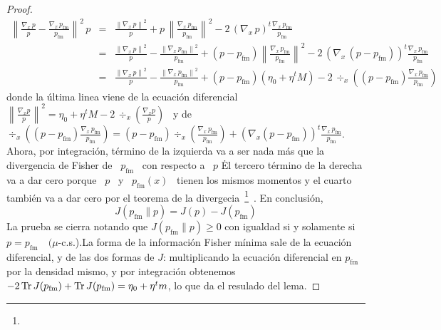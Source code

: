 \begin{proof}
  \begin{eqnarray*}
  \left\| \frac{\nabla_x \, p}{p} - \frac{\nabla_x
  \, p_{\mathrm{fm}}}{p_{\mathrm{fm}}} \right\|^2 \, p
  & = & \frac{\left\| \nabla_x \, p \right\|^2}{p} +
  p \, \left\| \frac{\nabla_x \, p_{\mathrm{fm}}}{p_{\mathrm{fm}}} \right\|^2 -
  2 \, \left( \nabla_x \, p \right)^t \frac{\nabla_x \,
  p_{\mathrm{fm}}}{p_{\mathrm{fm}}} \\[2.5mm]
  & = & \frac{\left\| \nabla_x \, p \right\|^2}{p} - \frac{\left\| \nabla_x \,
  p_{\mathrm{fm}} \right\|^2}{p_{\mathrm{fm}}} + \left( p -
  p_{\mathrm{fm}} \right) \left\| \frac{\nabla_x \,
  p_{\mathrm{fm}}}{p_{\mathrm{fm}}}  \right\|^2 - 2 \, \left( \nabla_x \, \left( p -
  p_{\mathrm{fm}} \right) \right)^t \frac{\nabla_x \, p_{\mathrm{fm}}}{p_{\mathrm{fm}}}\\[2.5mm]
  & = & \frac{\left\| \nabla_x \, p \right\|^2}{p} - \frac{\left\| \nabla_x \,
  p_{\mathrm{fm}} \right\|^2}{p_{\mathrm{fm}}} + \left( p -
  p_{\mathrm{fm}} \right) \left( \eta_0 + \eta^t M \right) - 2 \, \div_x\left( \left(
  p        -       p_{\mathrm{fm}}        \right)       \frac{\nabla_x        \,
  p_{\mathrm{fm}}}{p_{\mathrm{fm}}}      \right)
  \end{eqnarray*}
  donde   la   \'ultima   linea   viene   de   la   ecuaci\'on   diferencial   \
  $\left\|   \frac{\nabla_x   p}{p}  \right\|^2   =   \eta_0   +  \eta^t   M   -
  2 \, \div_x \left( \frac{\nabla_x p}{p} \right)$ \ y de \ $\div_x\left( \left(
  p        -       p_{\mathrm{fm}}        \right)       \frac{\nabla_x        \,
  p_{\mathrm{fm}}}{p_{\mathrm{fm}}}      \right)      =     \left(      p      -
  p_{\mathrm{fm}}       \right)       \div_x\left(       \frac{\nabla_x       \,
  p_{\mathrm{fm}}}{p_{\mathrm{fm}}}  \right)  +  \left(   \nabla_x  \left(  p  -
  p_{\mathrm{fm}}        \right)     \right)^t            \frac{\nabla_x             \,
  p_{\mathrm{fm}}}{p_{\mathrm{fm}}}$.
  Ahora, por integraci\'on, t\'ermino de la  izquierda va a ser nada m\'as que
  la divergencia de Fisher  de \ $p_{\mathrm{fm}}$ \ con respecto a  \ $p$ \. El
  tercero  t\'ermino  de  la  derecha  va  a  dar  cero  porque  \  $p$  \  y  \
  $p_{\mathrm{fm}}(x)$ \ tienen  los mismos momentos y el cuarto  tambi\'en va a
  dar cero por el teorema de la divergecia~\footnote{\SZ{A dar}}~\cite{toto}. En
  conclusi\'on,
  \[
  J( p_{\mathrm{fm}} \| p ) = J(p) - J(p_{\mathrm{fm}})
  \]
  La  prueba se cierra notando que $J( p_{\mathrm{fm}} \| p) \ge 0$
  con igualdad si  y solamente  si $p  =
  p_{\mathrm{fm}} \quad (\mu$-c.s.).\newline La forma de la informaci\'on Fisher
  m\'inima  sale de  la ecuaci\'on  diferencial,  y de  las dos  formas de  $J$:
  multiplicando la  ecuaci\'on diferencial en $p_{\mathrm{fm}}$  por la densidad
  mismo,  y  por integraci\'on  obtenemos  $-  2  \operatorname{Tr} J(p_{\mathrm{fm}})  +  \operatorname{Tr}
  J(p_{\mathrm{fm}}) = \eta_0 + \eta^t m$, lo que da el resulado del lema.
\end{proof}
